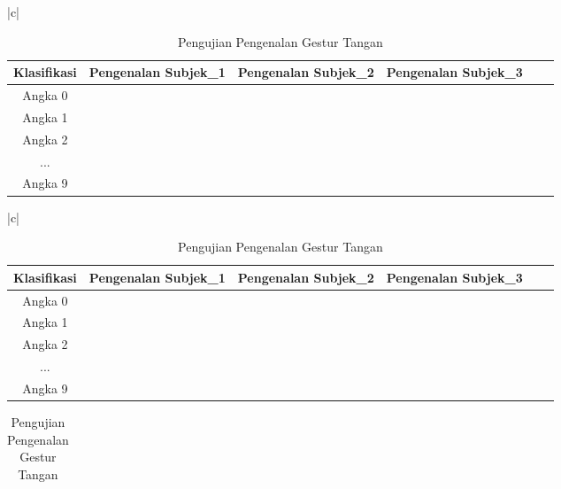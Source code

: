 \begin{table}[H]
	\caption{Pengujian Pengenalan Gestur Tangan}
	\vspace{0cm}
	\centering
\begin{tabular}{|c|}
	\hline
	\\

	\begin{tabular}{|c|c|c|c|c|c|c|c|c|c|c|c|c|c|c|c|c|c|c|c|c|c|c|c|c|c|c|c|c|c|c|c|c|}
		\hline
		Klasifikasi & \multicolumn{10}{|c|}{Pengenalan Subjek\_1}& \multicolumn{10}{|c|}{Pengenalan Subjek\_2}& \multicolumn{10}{|c|}{Pengenalan Subjek\_3}\\
		\hline Angka 0 & & & &&&&&&&&&&&&&&&&&&&&&&&&&&&\\
		\hline Angka 1 & & & &&&&&&&&&&&&&&&&&&&&&&&&&&&\\
		\hline Angka 2 & & & & && &&&&&&&&&&&&&&&&&&&&&&&&\\
		
		\hline ... & & & &&&&&&&&&&&&&&&&&&&&&&&&&&& \\
		\hline Angka 9 & & & &&&&&&&&&&&&&&&&&&&&&&&&&&& \\
		\hline
	\end{tabular}
\end{tabular}
\begin{tabular}{|c|}
	\\	
	\begin{tabular}{|c|c|c|c|c|c|c|c|c|c|c|c|c|c|c|c|c|c|c|c|c|c|c|c|c|c|c|c|c|c|c|c|c|}
		\hline
		Klasifikasi & \multicolumn{10}{|c|}{Pengenalan Subjek\_1}& \multicolumn{10}{|c|}{Pengenalan Subjek\_2}& \multicolumn{10}{|c|}{Pengenalan Subjek\_3}\\
		\hline Angka 0 & & & &&&&&&&&&&&&&&&&&&&&&&&&&&&\\
		\hline Angka 1 & & & &&&&&&&&&&&&&&&&&&&&&&&&&&&\\	
		\hline Angka 2 & & & &&&&&&&&&&&&&&&&&&&&&&&&&&&\\	
		\hline ... & & & &&&&&&&&&&&&&&&&&&&&&&&&&&& \\
		\hline Angka 9 & & & &&&&&&&&&&&&&&&&&&&&&&&&&&& \\
		\hline
	\end{tabular}	
\end{tabular}
\begin{tabular}{|c|}


\end{tabular}
\end{table}
